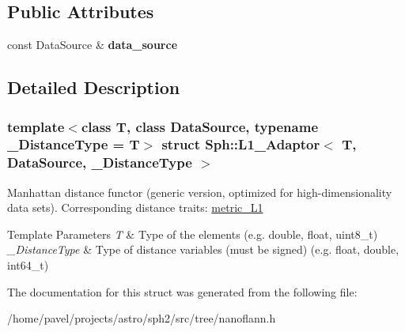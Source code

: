 \subsection*{Public Attributes}
\begin{DoxyCompactItemize}
\item 
\hypertarget{structSph_1_1L1__Adaptor_a6d97126b0f1ae1a7fe18345937c1ecfb}{}\label{structSph_1_1L1__Adaptor_a6d97126b0f1ae1a7fe18345937c1ecfb} 
const Data\+Source \& {\bfseries data\+\_\+source}
\end{DoxyCompactItemize}


\subsection{Detailed Description}
\subsubsection*{template$<$class T, class Data\+Source, typename \+\_\+\+Distance\+Type = T$>$\newline
struct Sph\+::\+L1\+\_\+\+Adaptor$<$ T, Data\+Source, \+\_\+\+Distance\+Type $>$}

Manhattan distance functor (generic version, optimized for high-\/dimensionality data sets). Corresponding distance traits\+: \hyperlink{structSph_1_1metric__L1}{metric\+\_\+\+L1} 
\begin{DoxyTemplParams}{Template Parameters}
{\em T} & Type of the elements (e.\+g. double, float, uint8\+\_\+t) \\
\hline
{\em \+\_\+\+Distance\+Type} & Type of distance variables (must be signed) (e.\+g. float, double, int64\+\_\+t) \\
\hline
\end{DoxyTemplParams}


The documentation for this struct was generated from the following file\+:\begin{DoxyCompactItemize}
\item 
/home/pavel/projects/astro/sph2/src/tree/nanoflann.\+h\end{DoxyCompactItemize}
